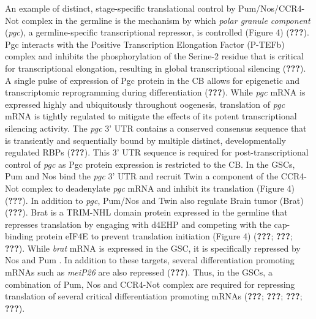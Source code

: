 \documentclass[12pt,oneside]{reedthesis}
\begin{document}
An example of distinct, stage-specific translational control by
Pum/Nos/CCR4-Not complex in the germline is the mechanism by which
\emph{polar granule component} (\emph{pgc}), a germline-specific transcriptional
repressor, is controlled (Figure 4) ({\textbf{???}}). Pgc interacts with
the Positive Transcription Elongation Factor (P-TEFb) complex and
inhibits the phosphorylation of the Serine-2 residue that is critical
for transcriptional elongation, resulting in global transcriptional
silencing ({\textbf{???}}). A single pulse of expression of Pgc
protein in the CB allows for epigenetic and transcriptomic reprogramming
during differentiation ({\textbf{???}}). While \emph{pgc} mRNA is expressed
highly and ubiquitously throughout oogenesis, translation of \emph{pgc} mRNA
is tightly regulated to mitigate the effects of its potent
transcriptional silencing activity. The \emph{pgc} 3' UTR contains a
conserved consensus sequence that is transiently and sequentially bound
by multiple distinct, developmentally regulated RBPs ({\textbf{???}}).
This 3' UTR sequence is required for post-transcriptional control of
\emph{pgc} as Pgc protein expression is restricted to the CB. In the GSCs,
Pum and Nos bind the \emph{pgc} 3' UTR and recruit Twin a component of the
CCR4-Not complex to deadenylate \emph{pgc} mRNA and inhibit its translation
(Figure 4) ({\textbf{???}}). In addition to \emph{pgc}, Pum/Nos and Twin also
regulate Brain tumor (Brat) ({\textbf{???}}). Brat is a TRIM-NHL domain
protein expressed in the germline that represses translation by engaging
with d4EHP and competing with the cap-binding protein eIF4E to prevent
translation initiation (Figure 4) ({\textbf{???}}; {\textbf{???}}; {\textbf{???}}). While \emph{brat} mRNA is expressed in the GSC, it is
specifically repressed by Nos and Pum . In addition to these targets,
several differentiation promoting mRNAs such as \emph{meiP26} are also
repressed ({\textbf{???}}). Thus, in the GSCs, a combination of Pum, Nos
and CCR4-Not complex are required for repressing translation of several
critical differentiation promoting mRNAs ({\textbf{???}}; {\textbf{???}}; {\textbf{???}}; {\textbf{???}}).
\end{document}
